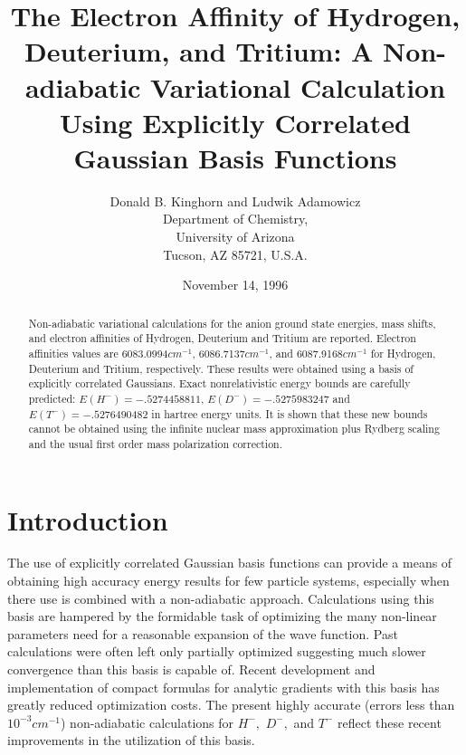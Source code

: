 \documentclass[12pt,thmsa]{article}
\begin{document}
\author{Donald B. Kinghorn and Ludwik Adamowicz \\
Department of Chemistry, \\
University of Arizona \\
Tucson, AZ 85721, U.S.A.}
\title{The Electron Affinity of Hydrogen, Deuterium, and Tritium: A Non-adiabatic
Variational Calculation Using Explicitly Correlated Gaussian Basis Functions}
\date{November 14, 1996}
\maketitle

\begin{abstract}
Non-adiabatic variational calculations for the anion ground state energies,
mass shifts, and electron affinities of Hydrogen, Deuterium and Tritium are
reported. Electron affinities values are 6083.0994$cm^{-1}$, 6086.7137$%
cm^{-1}$, and 6087.9168$cm^{-1}$ for Hydrogen, Deuterium and Tritium,
respectively. These results were obtained using a basis of explicitly
correlated Gaussians. Exact nonrelativistic energy bounds are carefully
predicted: $E\left( H^{-}\right) =-.5274458811$, $E\left( D^{-}\right)
=-.5275983247$ and $E\left( T^{-}\right) =-.5276490482$ in hartree energy
units. It is shown that these new bounds cannot be obtained using the
infinite nuclear mass approximation plus Rydberg scaling and the usual first
order mass polarization correction.
\end{abstract}

\section{Introduction}

The use of explicitly correlated Gaussian basis functions can provide a
means of obtaining high accuracy energy results for few particle systems,
especially when there use is combined with a non-adiabatic approach.
Calculations using this basis are hampered by the formidable task of
optimizing the many non-linear parameters need for a reasonable expansion of
the wave function. Past calculations were often left only partially
optimized suggesting much slower convergence than this basis is capable of.
Recent development and implementation of compact formulas for analytic
gradients with this basis has greatly reduced optimization costs\cite
{Kinghorn95a,Kinghorn95b}. The present highly accurate (errors less than $%
10^{-3}cm^{-1}$) non-adiabatic calculations for $H^{-},\,\,D^{-},\,\,$and $%
T^{-}$ reflect these recent improvements in the utilization of this basis.
\end{document}
